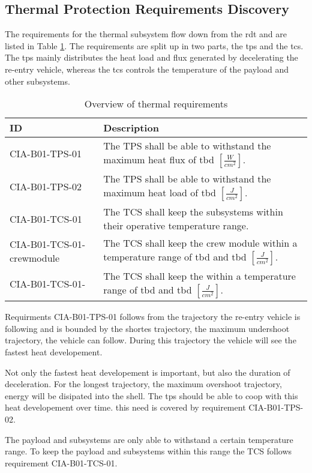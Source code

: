 \subsection{Thermal Protection Requirements Discovery} \label{sec:therm}
The requirements for the thermal subsystem flow down from the \gls{rdt} and are listed in Table \ref{tab:thermalreq}. The requirements are split up in two parts, the \gls{tps} and the \gls{tcs}. The \gls{tps} mainly distributes the heat load and flux generated by decelerating the re-entry vehicle, whereas the \gls{tcs} controls the temperature of the payload and other subsystems.


\begin{table}[H]
	\caption{Overview of thermal requirements}
	\begin{tabular}{|p{}|p{}|}
    \hline
    ID          & Description                                                                                                      \\ \hline \hline
    CIA-B01-TPS-01 & The TPS shall be able to withstand the maximum heat flux of \gls{tbd} $ \left[\frac{W}{cm^2}\right] $.               
\\ \hline
    CIA-B01-TPS-02 &  The TPS shall be able to withstand the maximum heat load of \gls{tbd} $ \left[\frac{J}{cm^2}\right] $.                
\\ \hline
    CIA-B01-TCS-01 & The TCS shall keep the subsystems within their operative temperature range.                                            
\\ \hline
    CIA-B01-TCS-01-crewmodule & The TCS shall keep the crew module within a temperature range of \gls{tbd} and \gls{tbd} $ \left[\frac{J}{cm^2}\right] $.                                        
\\ \hline
    CIA-B01-TCS-01- & The TCS shall keep the  within a temperature range of \gls{tbd} and \gls{tbd} $ \left[\frac{J}{cm^2}\right] $.                                        
\\ \hline

    \end{tabular}
    \label{tab:thermalreq}
\end{table}

Requirments CIA-B01-TPS-01 follows from the trajectory the re-entry vehicle is following and is bounded by the shortes trajectory, the maximum undershoot trajectory, the vehicle can follow. During this trajectory the vehicle will see the fastest heat developement.

Not only the fastest heat developement is important, but also the duration of deceleration. For the longest trajectory, the maximum overshoot trajectory, energy will be disipated into the shell. The \gls{tps} should be able to coop with this heat developement over time. this need is covered by requirement CIA-B01-TPS-02.

The payload and subsystems are only able to withstand a certain temperature range. To keep the payload and subsystems within this range the TCS follows requirement CIA-B01-TCS-01.

